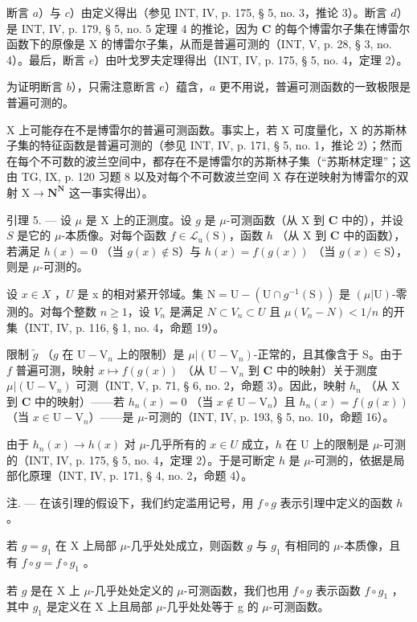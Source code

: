 断言 \(a\)）与 \(c\)）由定义得出（参见 INT, IV, p. 175, § 5, no. 3，推论 3）。断言 \(d\)）是 INT, IV, p. 179, § 5, no. 5 定理 4 的推论，因为 \(\mathbf{C}\) 的每个博雷尔子集在博雷尔函数下的原像是 X 的博雷尔子集，从而是普遍可测的（INT, V, p. 28, § 3, no. 4）。最后，断言 \(e\)）由叶戈罗夫定理得出（INT, IV, p. 175, § 5, no. 4，定理 2）。

为证明断言 \(b\)），只需注意断言 \(e\)）蕴含，\(a\) 更不用说，普遍可测函数的一致极限是普遍可测的。

X 上可能存在不是博雷尔的普遍可测函数。事实上，若 X 可度量化，X 的苏斯林子集的特征函数是普遍可测的（参见 INT, IV, p. 171, § 5, no. 1，推论 2）；然而在每个不可数的波兰空间中，都存在不是博雷尔的苏斯林子集（“苏斯林定理”；这由 TG, IX, p. 120 习题 8 以及对每个不可数波兰空间 X 存在逆映射为博雷尔的双射 \(\mathrm{X}\to\mathbf{N}^{\mathbf{N}}\) 这一事实得出）。

引理 5. --- 设 \(\mu\) 是 X 上的正测度。设 \(g\) 是 \(\mu\)-可测函数（从 X 到 \(\mathbf{C}\) 中的），并设 \(S\) 是它的 \(\mu\)-本质像。对每个函数 \(f \in \mathcal{L}_{\mathrm{u}}(\mathrm{S})\)，函数 \(h\) （从 X 到 \(\mathbf{C}\) 中的函数），若满足 \(h(x) = 0\) （当 \(g(x) \notin \mathrm{S}\)）与 \(h(x) = f(g(x))\) （当 \(g(x) \in \mathrm{S}\)），则是 \(\mu\)-可测的。

设 \(x \in X\) ，\(U\) 是 x 的相对紧开邻域。集 \(\mathrm{N} = \mathrm{U} - (\mathrm{U} \cap g^{-1}(\mathrm{S}))\) 是 \((\mu|\mathrm{U})\)-零测的。对每个整数 \(n \geqslant 1\)，设 \(V_{n}\) 是满足 \(N \subset V_{n} \subset U\) 且 \(\mu(V_{n} - N) < 1/n\) 的开集（INT, IV, p. 116, § 1, no. 4，命题 19）。

限制 \(\widetilde{g}\) （\(g\) 在 \(\mathrm{U}-\mathrm{V}_n\) 上的限制）是 \(\mu|(\mathrm{U}-\mathrm{V}_n)\)-正常的，且其像含于 S。由于 \(f\) 普遍可测，映射 \(x\mapsto f(g(x))\) （从 \(\mathrm{U}-\mathrm{V}_n\) 到 \(\mathbf{C}\) 中的映射）关于测度 \(\mu|(\mathrm{U}-\mathrm{V}_n)\) 可测（INT, V, p. 71, § 6, no. 2，命题 3）。因此，映射 \(h_n\) （从 X 到 \(\mathbf{C}\) 中的映射）——若 \(h_n(x) = 0\) （当 \(x\notin \mathrm{U}-\mathrm{V}_n\)）且 \(h_n(x) = f(g(x))\) （当 \(x\in \mathrm{U}-\mathrm{V}_n\)）——是 \(\mu\)-可测的（INT, IV, p. 193, § 5, no. 10，命题 16）。

由于 \(h_{n}(x) \to h(x)\) 对 \(\mu\)-几乎所有的 \(x \in U\) 成立，\(h\) 在 U 上的限制是 \(\mu\)-可测的（INT, IV, p. 175, § 5, no. 4，定理 2）。于是可断定 \(h\) 是 \(\mu\)-可测的，依据是局部化原理（INT, IV, p. 171, § 4, no. 2，命题 4）。

注. --- 在该引理的假设下，我们约定滥用记号，用 \(f \circ g\) 表示引理中定义的函数 \(h\) 。

若 \(g = g_{1}\) 在 X 上局部 \(\mu\)-几乎处处成立，则函数 \(g\) 与 \(g_{1}\) 有相同的 \(\mu\)-本质像，且有 \(f \circ g = f \circ g_{1}\) 。

若 \(g\) 是在 X 上 \(\mu\)-几乎处处定义的 \(\mu\)-可测函数，我们也用 \(f \circ g\) 表示函数 \(f \circ g_{1}\) ，其中 \(g_{1}\) 是定义在 X 上且局部 \(\mu\)-几乎处处等于 g 的 \(\mu\)-可测函数。


